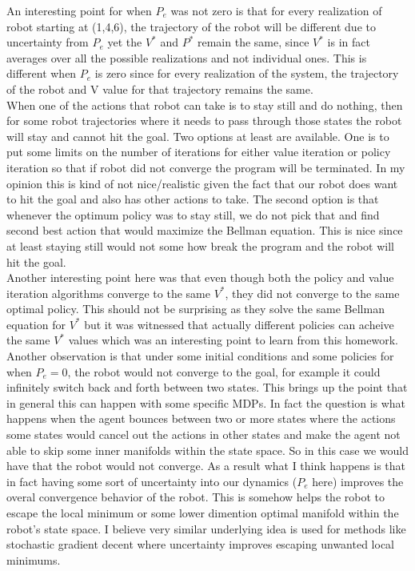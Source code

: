 \documentclass{article}
\begin{document}
	An interesting point for when $P_{e}$ was not zero is that for every realization of robot starting at (1,4,6), the trajectory of the robot will be different due to uncertainty from $P_{e}$ yet the $V^*$ and $P^*$ remain the same, since $V^*$ is in fact averages over all the possible realizations and not individual ones. This is different when $P_{e}$ is zero since for every realization of the system, the trajectory of the robot and V value for that trajectory remains the same. \\ 
	
	When one of the actions that robot can take is to stay still and do nothing, then for some robot trajectories where it needs to pass through those states the robot will stay and cannot hit the goal. Two options at least are available. One is to put some limits on the number of iterations for either value iteration or policy iteration so that if robot did not converge the program will be terminated. In my opinion this is kind of not nice/realistic given the fact that our robot does want to hit the goal and also has other actions to take. The second option is that whenever the optimum policy was to stay still, we do not pick that and find second best action that would maximize the Bellman equation. This is nice since at least staying still would not some how break the program and the robot will hit the goal. \\
	
	Another interesting point here was that even though both the policy and value iteration algorithms converge to the same $V^*$, they did not converge to the same optimal policy. This should not be surprising as they solve the same Bellman equation for $V^*$ but it was witnessed that actually different policies can acheive the same $V^*$ values which was an interesting point to learn from this homework.\\ 
	
	Another observation is that under some initial conditions and some policies for when $P_{e} = 0$, the robot would not converge to the goal, for example it could infinitely switch back and forth between two states. This brings up the point that in general this can happen with some specific MDPs. In fact the question is what happens when the agent bounces between two or more states where the actions some states would cancel out the actions in other states and make the agent not able to skip some inner manifolds within the state space. So in this case we would have that the robot would not converge. As a result what I think happens is that in fact having some sort of uncertainty into our dynamics ($P_{e}$ here) improves the overal convergence behavior of the robot. This is somehow helps the robot to escape the local minimum or some lower dimention optimal manifold within the robot's state space. I believe very similar underlying idea is used for methods like stochastic gradient decent where uncertainty improves escaping unwanted local minimums. 
\end{document}
